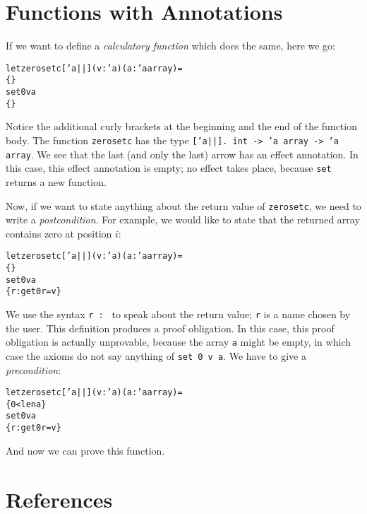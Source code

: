 \documentclass[a4paper]{scrreprt}
\begin{document}
\section{Functions with Annotations}

If we want to define a {\em calculatory function} which does the same, here we
go:
\begin{alltt}
  let zerosetc ['a||] (v : 'a) (a : 'a array) = 
    \{ \}
    set 0 v a
    \{ \}
\end{alltt}
Notice the additional curly brackets at the beginning and the end of the
function body. The function {\tt zerosetc} has the type {\tt ['a||]. int -> 'a
array ->{} 'a array}. We see that the last (and only the last) arrow has an
effect annotation. In this case, this effect annotation is empty; no effect
takes place, because {\tt set} returns a new function.

Now, if we want to state anything about the return value of {\tt zerosetc}, we
need to write a {\em postcondition}. For example, we would like to state that
the returned array contains zero at position $i$:
\begin{alltt}
  let zerosetc ['a||] (v : 'a) (a : 'a array) = 
    \{ \}
    set 0 v a
    \{ r : get 0 r = v \}
\end{alltt}
We use the syntax {\tt r : } to speak about the return value; {\tt r} is a
name chosen by the user. This definition produces a proof obligation. In this
case, this proof obligation is actually unprovable, because the array {\tt a}
might be empty, in which case the axioms do not say anything of {\tt set 0 v a}.
We have to give a {\em precondition}:
\begin{alltt}
  let zerosetc ['a||] (v : 'a) (a : 'a array) = 
    \{ 0 < len a \}
    set 0 v a
    \{ r : get 0 r = v \}
\end{alltt}
And now we can prove this function.

\section{References}
\end{document}
